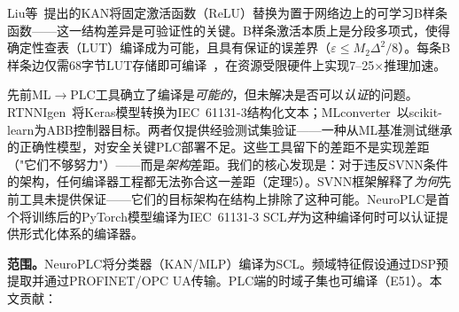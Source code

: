 \documentclass[journal,onecolumn]{IEEEtran}
\newcommand{\neuroplc}{NeuroPLC\xspace}
\theoremstyle{definition}
\theoremstyle{plain}
\theoremstyle{remark}
\begin{document}
Liu等~\cite{liu2024kan}提出的KAN将固定激活函数（ReLU）替换为置于网络边上的可学习B样条函数——这一结构差异是可验证性的关键。B样条激活本质上是分段多项式，使得确定性查表（LUT）编译成为可能，且具有保证的误差界（$\varepsilon \leq M_2\Delta^2/8$）。每条B样条边仅需68字节LUT存储即可编译~\cite{lutkan2025}，在资源受限硬件上实现7--25$\times$推理加速。

先前ML$\to$PLC工具确立了编译是\textit{可能的}，但未解决是否可以\textit{认证}的问题。RTNNIgen~\cite{rtnnigen2024}将Keras模型转换为IEC~61131-3结构化文本；MLconverter~\cite{mlconverter2025}以scikit-learn为ABB控制器目标。两者仅提供经验测试集验证——一种从ML基准测试继承的正确性模型，对安全关键PLC部署不足。这些工具留下的差距不是实现差距（"它们不够努力"）——而是\textit{架构}差距。我们的核心发现是：对于违反SVNN条件的架构，任何编译器工程都无法弥合这一差距（定理5）。SVNN框架解释了\textit{为何}先前工具未提供保证——它们的目标架构在结构上排除了这种可能。NeuroPLC是首个将训练后的PyTorch模型编译为IEC~61131-3 SCL\textit{并}为这种编译何时可以认证提供形式化体系的编译器。

\textbf{范围。}\neuroplc{}将分类器（KAN/MLP）编译为SCL。频域特征假设通过DSP预提取并通过PROFINET/OPC UA传输。PLC端的时域子集也可编译（E51）。本文贡献：
\end{document}
